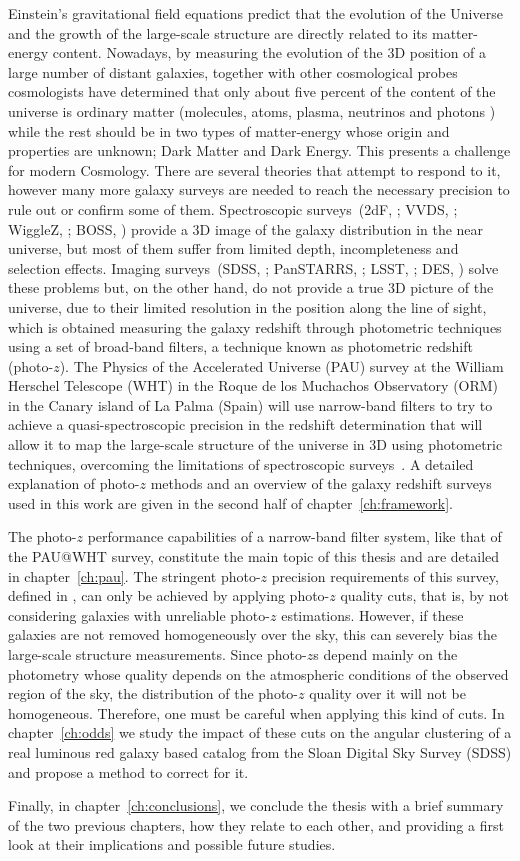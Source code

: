 Einstein's gravitational field equations predict that the evolution of the Universe and the growth of the large-scale structure are directly related to its matter-energy content. Nowadays, by measuring the evolution of the 3D position of a large number of distant galaxies, together with other cosmological probes cosmologists have determined that only about five percent of the content of the universe is ordinary matter (molecules, atoms, plasma, neutrinos and photons ) while the rest should be in two types of matter-energy whose origin and properties are unknown; Dark Matter and Dark Energy. This presents a challenge for modern Cosmology. There are several theories that attempt to respond to it, however many more galaxy surveys are needed to reach the necessary precision to rule out or confirm some of them. Spectroscopic surveys~(2dF, \citet{Colless2001}; VVDS, \citet{LeFevre2005}; WiggleZ, \citet{Drinkwater2010}; BOSS, \citet{Dawson2013}) provide a 3D image of the galaxy distribution in the near universe, but most of them suffer from limited depth, incompleteness and selection effects. Imaging surveys~(SDSS, \citet{York2000}; PanSTARRS, \citet{kaiser2000}; LSST, \citet{Tyson2003}; DES, \citet{}) solve these problems but, on the other hand, do not provide a true 3D picture of the universe, due to their limited resolution in the position along the line of sight, which is obtained measuring the galaxy redshift through photometric techniques using a set of broad-band filters, a technique known as photometric redshift (photo-$z$). The Physics of the Accelerated Universe (PAU) survey at the William Herschel Telescope (WHT) in the Roque de los Muchachos Observatory (ORM) in the Canary island of La Palma (Spain) will use narrow-band filters to try to achieve a quasi-spectroscopic precision in the redshift determination that will allow it to map the large-scale structure of the universe in 3D using photometric techniques, overcoming the limitations of spectroscopic surveys~\citep{Benitez2009}. A detailed explanation of photo-$z$ methods and an overview of the galaxy redshift surveys used in this work are given in the second half of chapter~\ref{ch:framework}.

The photo-$z$ performance capabilities of a narrow-band filter system, like that of the PAU@WHT survey, constitute the main topic of this thesis and are detailed in chapter~\ref{ch:pau}. The stringent photo-$z$ precision requirements of this survey, defined in \citet{Gaztanaga2012}, can only be achieved by applying photo-$z$ quality cuts, that is, by not considering galaxies with unreliable photo-$z$ estimations. However, if these galaxies are not removed homogeneously over the sky, this can severely bias the large-scale structure measurements. Since photo-$z$s depend mainly on the photometry whose quality depends on the atmospheric conditions of the observed region of the sky, the distribution of the photo-$z$ quality over it will not be homogeneous. Therefore, one must be careful when applying this kind of cuts. In chapter~\ref{ch:odds} we study the impact of these cuts on the angular clustering of a real luminous red galaxy based catalog \citep{Collister2007} from the Sloan Digital Sky Survey (SDSS) and propose a method to correct for it. 

Finally, in chapter~\ref{ch:conclusions}, we conclude the thesis with a brief summary of the two previous chapters, how they relate to each other, and providing a first look at their implications and possible future studies. 
